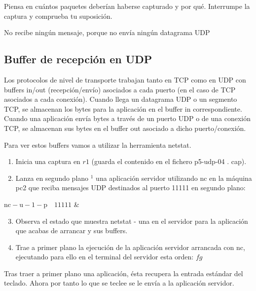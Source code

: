 \documentclass[12pt, a4paper]{report}
\begin{document}
Piensa en cuántos paquetes deberían haberse capturado y por qué. Interrumpe la captura y comprueba tu suposición.

No recibe ningún mensaje, porque no envía ningún datagrama UDP

\subsection{Buffer de recepción en UDP}
Los protocolos de nivel de transporte trabajan tanto en TCP como en UDP con buffers in/out (recepción/envío) asociados a cada puerto (en el caso de TCP asociados a cada conexión). Cuando llega un datagrama UDP o un segmento TCP, se almacenan los bytes para la aplicación en el buffer in correspondiente. Cuando una aplicación envía bytes a través de un puerto UDP o de una conexión TCP, se almacenan sus bytes en el buffer out asociado a dicho puerto/conexión.

Para ver estos buffers vamos a utilizar la herramienta netstat.

\begin{enumerate}
	\item Inicia una captura en $r 1$ (guarda el contenido en el fichero p5-udp-04 . cap).
	
	\item Lanza en segundo plano ${ }^{1}$ una aplicación servidor utilizando nc en la máquina pc2 que reciba mensajes UDP destinados al puerto 11111 en segundo plano:
	
\end{enumerate}

$\mathrm{nc}-\mathrm{u}-1-\mathrm{p} \quad 11111$ \&

\begin{enumerate}
	\setcounter{enumi}{2}
	\item Observa el estado que muestra netstat - una en el servidor para la aplicación que acabas de arrancar y sus buffers.
	
	\item Trae a primer plano la ejecución de la aplicación servidor arrancada con nc, ejecutando para ello en el terminal del servidor esta orden: $f g$
	
\end{enumerate}

Tras traer a primer plano una aplicación, ésta recupera la entrada estándar del teclado. Ahora por tanto lo que se teclee se le envía a la aplicación servidor.
\end{document}
